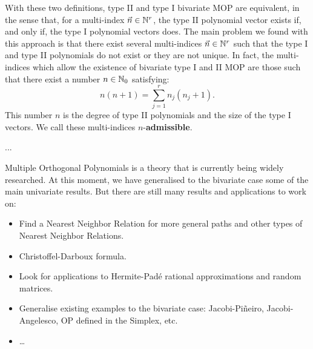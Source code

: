 \documentclass[portrait,final,a0paper,fontscale=0.38]{baposter}
\begin{document}
\begin{poster}
{  With these two definitions, type II and type I bivariate MOP are equivalent, in the sense that, for a multi-index $\vec n\in\mathbb{N}^r$, the type II polynomial vector exists if, and only if, the type I polynomial vectors does. The main problem we found with this approach is that there exist several multi-indices $\vec n\in\mathbb{N}^r$ such that the type I and type II polynomials do not exist or they are not unique. In fact, the multi-indices which allow the existence of bivariate type I and II MOP are those such that there exist a number $n\in\mathbb{N}_0$ satisfying:
  \begin{equation}
      \label{eq:condition-type-ii}
      \boxed{n(n+1) = \sum_{j=1}^r n_j (n_j+1).}
  \end{equation}
  This number $n$ is the degree of type II polynomials and the size of the type I vectors. We call these multi-indices $n$-\textbf{admissible}.

}

{
...
\bigskip
}
%


{
  Multiple Orthogonal Polynomials is a theory that is currently being widely researched. At this moment, we have generalised to the bivariate case some of the main univariate results. But there are still many results and applications to work on:
  \begin{itemize}
    \item Find a Nearest Neighbor Relation for more general paths and other types of Nearest Neighbor Relations.
    \item Christoffel-Darboux formula.
    \item Look for applications to Hermite-Padé rational approximations and random matrices.
    \item Generalise existing examples to the bivariate case: Jacobi-Piñeiro, Jacobi-Angelesco, OP defined in the Simplex, etc.
    \item \dots
  \end{itemize}


}
\end{poster}
\end{document}
